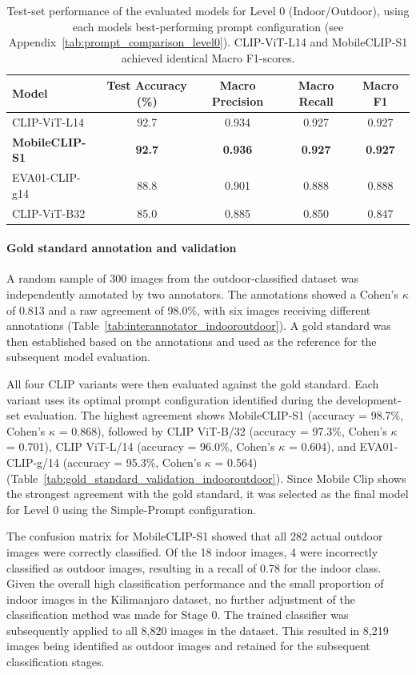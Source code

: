 \documentclass[11pt]{article}
\renewcommand{\_}{\textunderscore\allowbreak{}}
\begin{document}
\begin{table}[htbp]
\centering\small
\caption{Test-set performance of the evaluated models for Level 0 (Indoor/Outdoor), using each models best-performing prompt configuration (see Appendix~\ref{tab:prompt_comparison_level0}). CLIP-ViT-L14 and MobileCLIP-S1 achieved identical Macro F1-scores.}
\label{tab:level0_final_comparison}
\begin{tabular}{@{}lcccc@{}}
\toprule
\textbf{Model} & \textbf{Test Accuracy (\%)} & \textbf{Macro Precision} & \textbf{Macro Recall} & \textbf{Macro F1} \\
\midrule
CLIP-ViT-L14              & 92.7 & 0.934 & 0.927 & 0.927 \\
\textbf{MobileCLIP-S1} & \textbf{92.7} & \textbf{0.936} & \textbf{0.927} & \textbf{0.927} \\
EVA01-CLIP-g14             & 88.8 & 0.901 & 0.888 & 0.888 \\
CLIP-ViT-B32               & 85.0 & 0.885 & 0.850 & 0.847 \\
\bottomrule
\end{tabular}
\end{table}

\paragraph{Gold standard annotation and validation}
A random sample of 300 images from the outdoor-classified dataset was independently annotated by two annotators. The annotations showed a Cohen's $\kappa$ of 0.813 and a raw agreement of 98.0\%, with six images receiving different annotations (Table~\ref{tab:interannotator_indooroutdoor}). A gold standard was then established based on the annotations and used as the reference for the subsequent model evaluation.

All four CLIP variants were then evaluated against the gold standard. Each variant uses its optimal prompt configuration identified during the development-set evaluation. The highest agreement shows MobileCLIP-S1 (accuracy = 98.7\%, Cohen's $\kappa$ = 0.868), followed by CLIP ViT-B/32 (accuracy = 97.3\%, Cohen's $\kappa$ = 0.701), CLIP ViT-L/14 (accuracy = 96.0\%, Cohen's $\kappa$ = 0.604), and EVA01-CLIP-g/14 (accuracy = 95.3\%, Cohen's $\kappa$ = 0.564) (Table~\ref{tab:gold_standard_validation_indooroutdoor}). Since Mobile Clip shows the strongest agreement with the gold standard, it was selected as the final model for Level 0 using the Simple-Prompt configuration.

The confusion matrix for MobileCLIP-S1 showed that all 282 actual outdoor images were correctly classified. Of the 18 indoor images, 4 were incorrectly classified as outdoor images, resulting in a recall of 0.78 for the indoor class. Given the overall high classification performance and the small proportion of indoor images in the Kilimanjaro dataset, no further adjustment of the classification method was made for Stage 0. The trained classifier was subsequently applied to all 8,820 images in the dataset. This resulted in 8,219 images being identified as outdoor images and retained for the subsequent classification stages.
\end{document}
